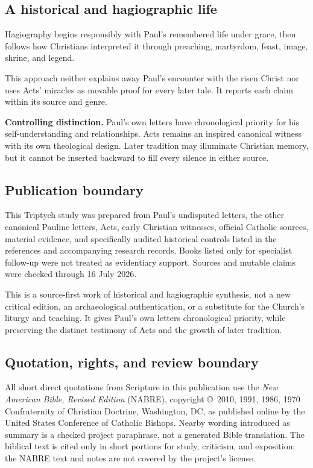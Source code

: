 \subsection{A historical and hagiographic life}

Hagiography begins responsibly with Paul's remembered life under grace, then
follows how Christians interpreted it through preaching,
martyrdom, feast, image, shrine, and legend.

This approach neither explains away Paul's encounter with the risen Christ nor
uses Acts' miracles as movable proof for every later tale. It reports each
claim within its source and genre.

\begin{studyframe}
\textbf{Controlling distinction.} Paul's own letters have chronological
priority for his self-understanding and relationships. Acts remains an
inspired canonical witness with its own theological design. Later tradition
may illuminate Christian memory, but it cannot be inserted backward to fill
every silence in either source.
\end{studyframe}

\subsection{Publication boundary}

This Triptych study was prepared from Paul's undisputed letters, the other
canonical Pauline letters, Acts, early Christian witnesses, official Catholic
sources, material evidence, and specifically audited historical controls
listed in the references and accompanying research records. Books listed only
for specialist follow-up were not treated as evidentiary support. Sources and
mutable claims were checked through 16 July 2026.

This is a source-first work of historical and hagiographic synthesis, not a new
critical edition, an archaeological authentication, or a substitute for the
Church's liturgy and teaching. It gives Paul's own letters chronological
priority, while preserving the distinct testimony of Acts and the growth of
later tradition.

\subsection{Quotation, rights, and review boundary}

All short direct quotations from Scripture in this publication use the
\emph{New American Bible, Revised Edition} (NABRE), copyright \copyright\ 2010,
1991, 1986, 1970 Confraternity of Christian Doctrine, Washington, DC, as
published online by the United States Conference of Catholic Bishops. Nearby
wording introduced as summary is a checked project paraphrase, not a generated
Bible translation. The biblical text is cited only in short portions for
study, criticism, and exposition; the NABRE text and notes are not covered by
the project's license.

